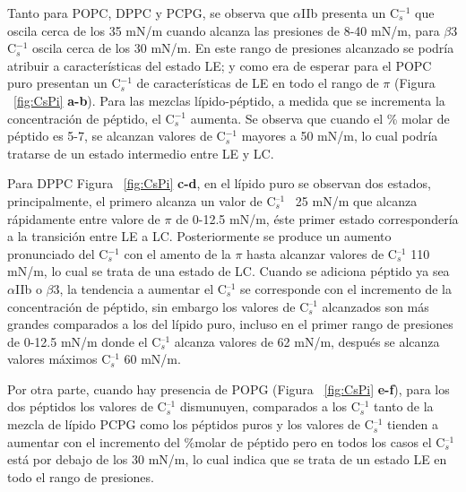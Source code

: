 {%
%
%

Tanto para POPC, DPPC y PCPG, se observa que $\alpha$IIb presenta un C$_s^{-1}$ que oscila cerca de los 35 mN/m cuando alcanza las presiones de 8-40 mN/m, para $\beta$3 C$_s^{-1}$ oscila cerca de los 30 mN/m. En este rango de presiones alcanzado se podría atribuir a características del estado LE; y como era de esperar para el POPC puro presentan un C$_s^{-1}$ de características de LE en todo el rango de $\pi$ (Figura ~\ref{fig:CsPi} \textbf{a-b}). Para las mezclas lípido-péptido, a medida que se incrementa la concentración de péptido, el C$_s^{-1}$ aumenta. Se observa que cuando el \% molar de péptido es 5-7, se alcanzan valores de C$_s^{-1}$ mayores a 50 mN/m, lo cual podría tratarse de un estado intermedio entre LE y LC.

Para DPPC Figura ~\ref{fig:CsPi} \textbf{c-d}, en el lípido puro se observan dos estados, principalmente, el primero alcanza un valor de C$_s^{\text{--}1}$  ~25 mN/m que alcanza rápidamente entre valore de $\pi$ de 0-12.5 mN/m, éste primer estado correspondería a la transición entre LE a LC. Posteriormente se produce un aumento pronunciado del C$_s^{-1}$ con el amento de la $\pi$ hasta alcanzar valores de C$_s^{\text{--}1}$  110 mN/m, lo cual se trata de una estado de LC. Cuando se adiciona péptido ya sea $\alpha$IIb o $\beta$3, la tendencia a aumentar el C$_s^{\text{--}1}$  se corresponde con el incremento de la concentración de péptido, sin embargo los valores de C$_s^{\text{--}1}$ alcanzados son más grandes comparados a los del lípido puro, incluso en el primer rango de presiones de 0-12.5 mN/m donde el C$_s^{\text{--}1}$ alcanza valores de 62 mN/m, después se alcanza valores máximos C$_s^{\text{--}1}$ 60 mN/m.

Por otra parte, cuando hay presencia de POPG (Figura ~\ref{fig:CsPi} \textbf{e-f}), para los dos péptidos los valores de C$_s^{\text{--}1}$ dismunuyen, comparados a los C$_s^{\text{--}1}$ tanto de la mezcla de lípido PCPG como los péptidos puros y los valores de C$_s^{\text{--}1}$  tienden a aumentar con el incremento del \%molar de péptido pero en todos los casos el C$_s^{\text{--}1}$ está por debajo de los 30 mN/m, lo cual indica que se trata de un estado LE en todo el rango de presiones.


}
